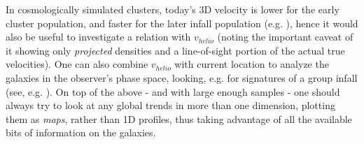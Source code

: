 \documentclass[useAMS,usenatbib]{mn2e}
\begin{document}
In cosmologically simulated clusters, today's 3D velocity is lower for the early cluster population, and faster for the later infall population (e.g. \citealt{smith:2015}), hence it would also be useful to investigate a relation with $v_{helio}$ (noting the important caveat of it showing only \textit{projected} densities and a line-of-sight portion of the actual true velocities). One can also combine $v_{helio}$ with current location to analyze the galaxies in the observer's phase space, looking, e.g. for signatures of a group infall (see, e.g. \citealt{vijayaraghavan:2015}). On top of the above - and with large enough samples - one should always try to look at any global trends in more than one dimension, plotting them as \textit{maps}, rather than 1D profiles, thus taking advantage of all the available bits of information on the galaxies.
\end{document}
